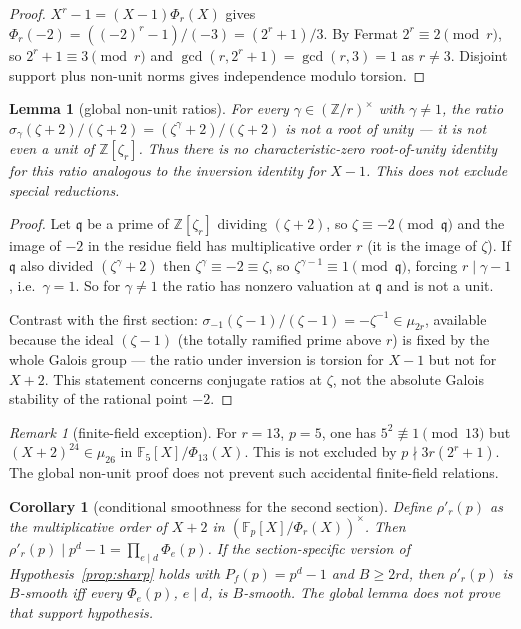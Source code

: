 \documentclass[11pt]{article}
\newtheorem{lemma}[theorem]{Lemma}
\newtheorem{corollary}[theorem]{Corollary}
\theoremstyle{remark}
\newtheorem{remark}[theorem]{Remark}
\newcommand{\Z}{\mathbb{Z}}
\newcommand{\F}{\mathbb{F}}
\begin{document}
\begin{proof}
$X^r - 1 = (X-1)\Phi_r(X)$ gives $\Phi_r(-2) = ((-2)^r - 1)/(-3) =
(2^r+1)/3$. By Fermat $2^r \equiv 2 \pmod r$, so $2^r + 1 \equiv 3
\pmod r$ and $\gcd(r, 2^r+1) = \gcd(r,3) = 1$ as $r \ne 3$. Disjoint
support plus non-unit norms gives independence modulo torsion.
\end{proof}

\begin{lemma}[global non-unit ratios]\label{lem:nocollapse}
For every $\gamma \in (\Z/r)^\times$ with $\gamma \ne 1$, the ratio
$\sigma_\gamma(\zeta+2)/(\zeta+2) = (\zeta^\gamma + 2)/(\zeta + 2)$ is not a
root of unity --- it is not even a unit of $\Z[\zeta_r]$. Thus there is no
characteristic-zero root-of-unity identity for this ratio analogous to the
inversion identity for $X-1$. This does not exclude special reductions.
\end{lemma}

\begin{proof}
Let $\mathfrak q$ be a prime of $\Z[\zeta_r]$ dividing $(\zeta + 2)$, so
$\zeta \equiv -2 \pmod{\mathfrak q}$ and the image of $-2$ in the residue
field has multiplicative order $r$ (it is the image of $\zeta$). If
$\mathfrak q$ also divided $(\zeta^\gamma + 2)$ then $\zeta^\gamma \equiv
-2 \equiv \zeta$, so $\zeta^{\gamma - 1} \equiv 1 \pmod{\mathfrak q}$,
forcing $r \mid \gamma - 1$, i.e.\ $\gamma = 1$. So for $\gamma \ne 1$ the
ratio has nonzero valuation at $\mathfrak q$ and is not a unit.

Contrast with the first section: $\sigma_{-1}(\zeta - 1)/(\zeta - 1) =
-\zeta^{-1} \in \mu_{2r}$, available because the ideal $(\zeta - 1)$ (the
totally ramified prime above $r$) is fixed by the whole Galois group ---
the ratio under inversion is torsion for $X-1$ but not for $X+2$.
This statement concerns conjugate ratios at $\zeta$, not the absolute
Galois stability of the rational point $-2$.
\end{proof}

\begin{remark}[finite-field exception]
For $r=13$, $p=5$, one has $5^2\not\equiv1\pmod{13}$ but
$(X+2)^{24}\in\mu_{26}$ in $\F_5[X]/\Phi_{13}(X)$.
This is not excluded by $p\nmid3r(2^r+1)$. The global non-unit proof
does not prevent such accidental finite-field relations.
\end{remark}

\begin{corollary}[conditional smoothness for the second section]\label{cor:fullsupport}
Define $\rho'_r(p)$ as the multiplicative order of $X + 2$ in
$(\F_p[X]/\Phi_r(X))^\times$. Then $\rho'_r(p) \mid p^d - 1 =
\prod_{e \mid d}\Phi_e(p)$. If the section-specific version of
Hypothesis~\ref{prop:sharp} holds with $P_f(p)=p^d-1$ and $B\ge2rd$,
then $\rho'_r(p)$ is $B$-smooth iff every $\Phi_e(p)$, $e\mid d$, is
$B$-smooth. The global lemma does not prove that support hypothesis.
\end{corollary}
\end{document}
